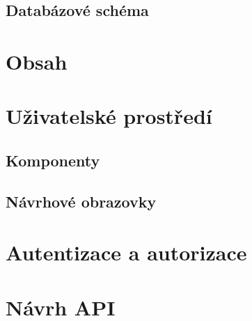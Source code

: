 \subsection{Databázové schéma}

\section{Obsah}\label{text:navrh/obsah}

\section{Uživatelské prostředí}

\subsection{Komponenty}

\subsection{Návrhové obrazovky}

\section{Autentizace a autorizace}\label{text:navrh/auth}

\section{Návrh API}


